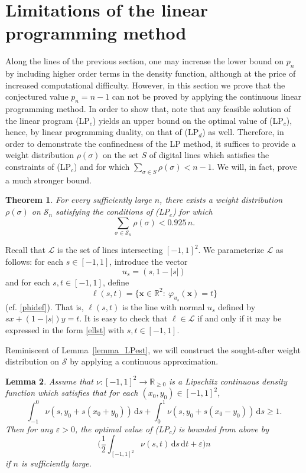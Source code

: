 \documentclass[11pt,a4paper]{amsart}
\newtheorem{theorem}{Theorem}
\newtheorem{lemma}[theorem]{Lemma}
\newcommand{\R}{\mathbb{R}}
\newcommand{\eps}{\varepsilon}
\newcommand{\dd}{\,\mathrm{d}}
\newcommand{\Sc}{\mathcal{S}}
\newcommand{\Lc}{\mathcal{L}}
\newcommand{\x}{\mathbf{x}}
\begin{document}
\section{Limitations of the linear programming method}
\label{section_LPlimit}

Along the lines of the previous section, one may increase the lower bound on $p_n$ by including higher order terms in the density function, although at the price of increased computational difficulty. However, in this section we prove that the conjectured value $p_n = n-1$ can not be proved by applying the continuous linear programming method. In order to show that, note that any feasible solution of the linear program (LP$_c$) yields an upper bound on the optimal value of (LP$_c$), hence, by linear programming duality, on that of (LP$_d$) as well. Therefore, in order to demonstrate the confinedness of the LP method, it suffices to provide a weight distribution $\rho(\sigma)$ on the set $S$ of  digital lines which satisfies the constraints of (LP$_c$) and for which $\sum_{\sigma \in S} \rho(\sigma) < n-1$. We will, in fact, prove a much stronger bound.
\begin{theorem}
\label{thm_LPupper}
For every sufficiently large $n$, there exists a weight distribution $\rho(\sigma)$ on $\Sc_n$ satisfying the conditions of (LP$_c$) for which
\[
\sum_{\sigma \in \Sc_n} \rho(\sigma) < 0.925 \, n.
\]
\end{theorem}




Recall that $\Lc$ is the set of lines intersecting $[-1,1]^2$. We parameterize $\Lc$ as follows: for each $s \in [-1, 1]$, introduce the vector
\[
u_s = (s, 1- |s|)
\]
and for each $s, t \in [-1,1]$, define
\begin{equation}\label{ellst}
\ell(s,t) = \{ \x \in \R^2: \ \varphi_{u_s}(\x) = t \}
 \end{equation}
(cf. \eqref{phidef}). That is, $\ell(s,t)$ is the line with normal $u_s$  defined by $s x + (1 - |s|) y = t$. It is easy to check that $\ell \in \Lc$  if and only if it may be expressed in the form \eqref{ellst} with $s,t \in [-1,1]$.



Reminiscent of Lemma~\ref{lemma_LPest}, we will construct the sought-after weight distribution on $\Sc$
by applying a continuous approximation.

\begin{lemma}
\label{lemma_LPupper}
Assume that $\nu: [-1,1]^2 \rightarrow \R_{\geq 0}$ is a Lipschitz continuous density function which satisfies that for each $(x_0, y_0) \in [-1,1]^2$,
\begin{equation}
\label{nucond1}
   \int_{-1}^0 \nu (s, y_0 + s(x_0 + y_0) ) \dd s +
\int_{0}^1  \nu (s, y_0 + s(x_0 - y_0) ) \dd s \geq 1.
\end{equation}
Then for any $\eps>0$, the optimal value of {\rm (LP$_c$)} is bounded from above by
\[
\Big (  \frac 1 2 \int_{[-1,1]^2} \nu(s,t) \dd s \dd t  + \eps \Big ) n
\]
if $n$ is sufficiently large.

\end{lemma}
\end{document}
